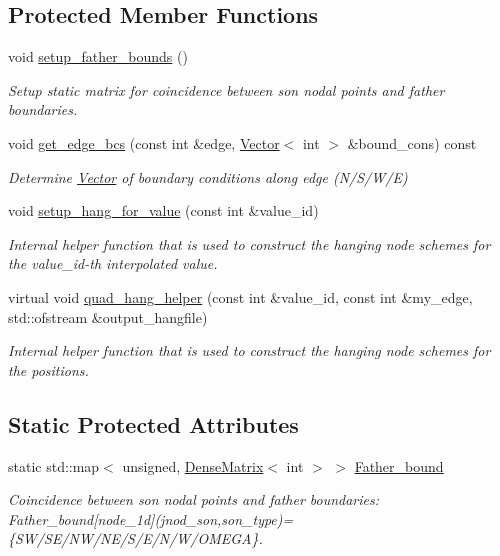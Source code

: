 \subsection*{Protected Member Functions}
\begin{DoxyCompactItemize}
\item 
void \hyperlink{classoomph_1_1RefineableQElement_3_012_01_4_ae72bc768135f78c574710524293bdbe2}{setup\+\_\+father\+\_\+bounds} ()
\begin{DoxyCompactList}\small\item\em Setup static matrix for coincidence between son nodal points and father boundaries. \end{DoxyCompactList}\item 
void \hyperlink{classoomph_1_1RefineableQElement_3_012_01_4_a00bdd114af9683a6097acdf4d11912ae}{get\+\_\+edge\+\_\+bcs} (const int \&edge, \hyperlink{classoomph_1_1Vector}{Vector}$<$ int $>$ \&bound\+\_\+cons) const
\begin{DoxyCompactList}\small\item\em Determine \hyperlink{classoomph_1_1Vector}{Vector} of boundary conditions along edge (N/\+S/\+W/E) \end{DoxyCompactList}\item 
void \hyperlink{classoomph_1_1RefineableQElement_3_012_01_4_a8bbe1fddb5da77e580fd1d2f90468061}{setup\+\_\+hang\+\_\+for\+\_\+value} (const int \&value\+\_\+id)
\begin{DoxyCompactList}\small\item\em Internal helper function that is used to construct the hanging node schemes for the value\+\_\+id-\/th interpolated value. \end{DoxyCompactList}\item 
virtual void \hyperlink{classoomph_1_1RefineableQElement_3_012_01_4_a711171287234070046a02bbf56ed2664}{quad\+\_\+hang\+\_\+helper} (const int \&value\+\_\+id, const int \&my\+\_\+edge, std\+::ofstream \&output\+\_\+hangfile)
\begin{DoxyCompactList}\small\item\em Internal helper function that is used to construct the hanging node schemes for the positions. \end{DoxyCompactList}\end{DoxyCompactItemize}
\subsection*{Static Protected Attributes}
\begin{DoxyCompactItemize}
\item 
static std\+::map$<$ unsigned, \hyperlink{classoomph_1_1DenseMatrix}{Dense\+Matrix}$<$ int $>$ $>$ \hyperlink{classoomph_1_1RefineableQElement_3_012_01_4_a95f17825b651c0ce6ec5daa2dd7c8fde}{Father\+\_\+bound}
\begin{DoxyCompactList}\small\item\em Coincidence between son nodal points and father boundaries\+: Father\+\_\+bound\mbox{[}node\+\_\+1d\mbox{]}(jnod\+\_\+son,son\+\_\+type)=\{S\+W/\+S\+E/\+N\+W/\+N\+E/\+S/\+E/\+N/\+W/\+O\+M\+E\+GA\}. \end{DoxyCompactList}\end{DoxyCompactItemize}
